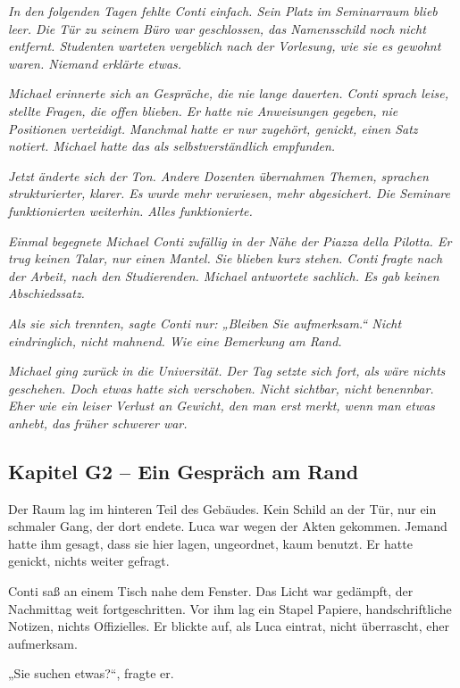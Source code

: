 \documentclass[
]{article}
\begin{document}
\emph{In den folgenden Tagen fehlte Conti einfach. Sein Platz im Seminarraum blieb leer. Die Tür zu seinem Büro war geschlossen, das Namensschild noch nicht entfernt. Studenten warteten vergeblich nach der Vorlesung, wie sie es gewohnt waren. Niemand erklärte etwas.}

\emph{Michael erinnerte sich an Gespräche, die nie lange dauerten. Conti sprach leise, stellte Fragen, die offen blieben. Er hatte nie Anweisungen gegeben, nie Positionen verteidigt. Manchmal hatte er nur zugehört, genickt, einen Satz notiert. Michael hatte das als selbstverständlich empfunden.}

\emph{Jetzt änderte sich der Ton. Andere Dozenten übernahmen Themen, sprachen strukturierter, klarer. Es wurde mehr verwiesen, mehr abgesichert. Die Seminare funktionierten weiterhin. Alles funktionierte.}

\emph{Einmal begegnete Michael Conti zufällig in der Nähe der Piazza della Pilotta. Er trug keinen Talar, nur einen Mantel. Sie blieben kurz stehen. Conti fragte nach der Arbeit, nach den Studierenden. Michael antwortete sachlich. Es gab keinen Abschiedssatz.}

\emph{Als sie sich trennten, sagte Conti nur: „Bleiben Sie aufmerksam.`` Nicht eindringlich, nicht mahnend. Wie eine Bemerkung am Rand.}

\emph{Michael ging zurück in die Universität. Der Tag setzte sich fort, als wäre nichts geschehen. Doch etwas hatte sich verschoben. Nicht sichtbar, nicht benennbar. Eher wie ein leiser Verlust an Gewicht, den man erst merkt, wenn man etwas anhebt, das früher schwerer war.}

\subsection{Kapitel G2 -- Ein Gespräch am Rand}\label{kapitel-g2-ein-gespruxe4ch-am-rand}

Der Raum lag im hinteren Teil des Gebäudes. Kein Schild an der Tür, nur ein schmaler Gang, der dort endete. Luca war wegen der Akten gekommen. Jemand hatte ihm gesagt, dass sie hier lagen, ungeordnet, kaum benutzt. Er hatte genickt, nichts weiter gefragt.

Conti saß an einem Tisch nahe dem Fenster. Das Licht war gedämpft, der Nachmittag weit fortgeschritten. Vor ihm lag ein Stapel Papiere, handschriftliche Notizen, nichts Offizielles. Er blickte auf, als Luca eintrat, nicht überrascht, eher aufmerksam.

„Sie suchen etwas?{\kern0pt}``, fragte er.
\end{document}
